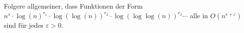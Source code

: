 \begin{sheet}
\begin{problem}
\begin{subproblem}
            Folgere allgemeiner, dass Funktionen der Form $n^s\cdot \log(n)^{r_1} \cdot \log(\log(n))^{r_2} \cdot \log(\log\log(n))^{r_2}\cdots$ alle in $O(n^{s+\varepsilon})$ sind für jedes $\varepsilon>0$.
        \end{subproblem}
    \end{problem}

\end{sheet}
